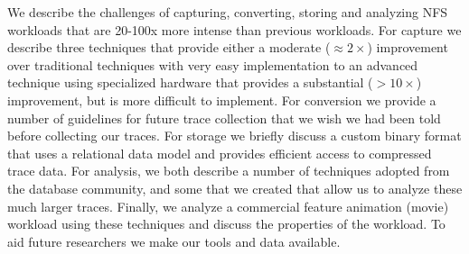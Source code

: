 We describe the challenges of capturing, converting, storing and
analyzing NFS workloads that are 20-100x more intense than previous
workloads.  For capture we describe three techniques that provide
either a moderate ($\approx{}2\times$) improvement over traditional
techniques with very easy implementation to an advanced technique
using specialized hardware that provides a substantial ($>10\times$)
improvement, but is more difficult to implement.  For conversion we
provide a number of guidelines for future trace collection that we
wish we had been told before collecting our traces.  For storage we
briefly discuss a custom binary format that uses a relational data
model and provides efficient access to compressed trace data.  For
analysis, we both describe a number of techniques adopted from the
database community, and some that we created that allow us to analyze
these much larger traces.  Finally, we analyze a commercial feature
animation (movie) workload using these techniques and discuss the
properties of the workload.  To aid future researchers we make our
tools and data available.

